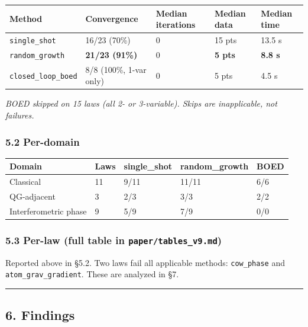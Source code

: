 \documentclass[
]{article}
\newcounter{none} %
\begin{document}
{\def\LTcaptype{none} %
\begin{longtable}[]{@{}lllll@{}}
\toprule\noalign{}
Method & Convergence & Median iterations & Median data & Median time \\
\midrule\noalign{}
\endhead
\bottomrule\noalign{}
\endlastfoot
\texttt{single\_shot} & 16/23 (70\%) & 0 & 15 pts & 13.5 s \\
\texttt{random\_growth} & \textbf{21/23 (91\%)} & 0 & \textbf{5 pts} &
\textbf{8.8 s} \\
\texttt{closed\_loop\_boed} & 8/8 (100\%, 1-var only) & 0 & 5 pts & 4.5
s \\
\end{longtable}
}

\emph{BOED skipped on 15 laws (all 2- or 3-variable). Skips are
inapplicable, not failures.}

\subsubsection{5.2 Per-domain}\label{per-domain}

{\def\LTcaptype{none} %
\begin{longtable}[]{@{}lllll@{}}
\toprule\noalign{}
Domain & Laws & single\_shot & random\_growth & BOED \\
\midrule\noalign{}
\endhead
\bottomrule\noalign{}
\endlastfoot
Classical & 11 & 9/11 & 11/11 & 6/6 \\
QG-adjacent & 3 & 2/3 & 3/3 & 2/2 \\
Interferometric phase & 9 & 5/9 & 7/9 & 0/0 \\
\end{longtable}
}

\subsubsection{\texorpdfstring{5.3 Per-law (full table in
\texttt{paper/tables\_v9.md})}{5.3 Per-law (full table in paper/tables\_v9.md)}}\label{per-law-full-table-in-papertables_v9.md}

Reported above in §5.2. Two laws fail all applicable methods:
\texttt{cow\_phase} and \texttt{atom\_grav\_gradient}. These are
analyzed in §7.

\begin{center}\rule{0.5\linewidth}{0.5pt}\end{center}

\subsection{6. Findings}\label{findings}
\end{document}
